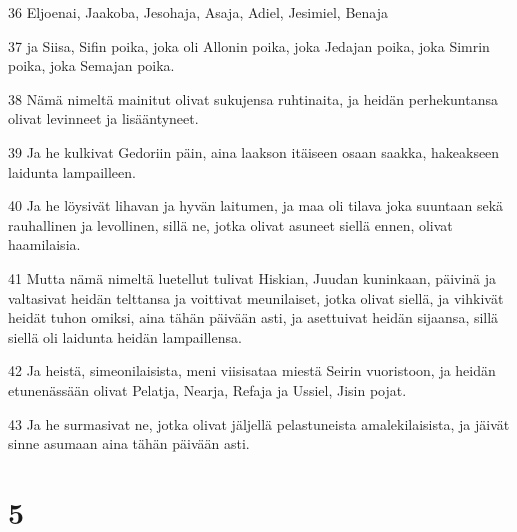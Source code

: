 \par 36 Eljoenai, Jaakoba, Jesohaja, Asaja, Adiel, Jesimiel, Benaja
\par 37 ja Siisa, Sifin poika, joka oli Allonin poika, joka Jedajan poika, joka Simrin poika, joka Semajan poika.
\par 38 Nämä nimeltä mainitut olivat sukujensa ruhtinaita, ja heidän perhekuntansa olivat levinneet ja lisääntyneet.
\par 39 Ja he kulkivat Gedoriin päin, aina laakson itäiseen osaan saakka, hakeakseen laidunta lampailleen.
\par 40 Ja he löysivät lihavan ja hyvän laitumen, ja maa oli tilava joka suuntaan sekä rauhallinen ja levollinen, sillä ne, jotka olivat asuneet siellä ennen, olivat haamilaisia.
\par 41 Mutta nämä nimeltä luetellut tulivat Hiskian, Juudan kuninkaan, päivinä ja valtasivat heidän telttansa ja voittivat meunilaiset, jotka olivat siellä, ja vihkivät heidät tuhon omiksi, aina tähän päivään asti, ja asettuivat heidän sijaansa, sillä siellä oli laidunta heidän lampaillensa.
\par 42 Ja heistä, simeonilaisista, meni viisisataa miestä Seirin vuoristoon, ja heidän etunenässään olivat Pelatja, Nearja, Refaja ja Ussiel, Jisin pojat.
\par 43 Ja he surmasivat ne, jotka olivat jäljellä pelastuneista amalekilaisista, ja jäivät sinne asumaan aina tähän päivään asti.

\chapter{5}

